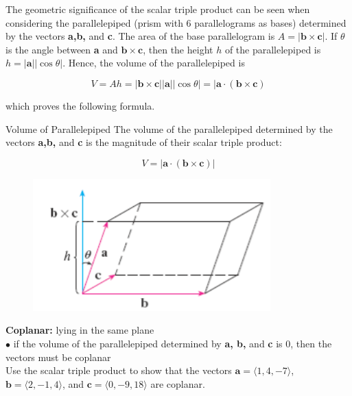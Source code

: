         The geometric significance of the scalar triple product can be seen when considering the parallelepiped (prism with 6 parallelograms as bases) determined by the vectors \textbf{a,b,} and \textbf{c}. The area of
        the base parallelogram is $A = |\mathbf{b\times c}|$. If $\theta$ is the angle between \textbf{a} and $\mathbf{b\times c}$, then the height $h$ of the parallelepiped is $h = |\mathbf{a}||\cos{\theta}|$. Hence,
        the volume of the parallelepiped is

        \[
            V = Ah = |\mathbf{b\times c}||\mathbf{a}||\cos{\theta}| = |\mathbf{a\cdot (b\times c)}
        \]

        which proves the following formula.

        \begin{axiom}{Volume of Parallelepiped}
            The volume of the parallelepiped determined by the vectors \textbf{a,b,} and \textbf{c} is the magnitude of their scalar triple product:

            \[
                V = |\mathbf{a\cdot (b\times c)}|
            \]
        \end{axiom}

        \begin{figure}[hbt!]
            \centering
            \includegraphics[]{Resources/12.4_Parallelepiped}
        \end{figure}

        \textbf{Coplanar:} lying in the same plane \\
        $\bullet$ if the volume of the parallelepiped determined by \textbf{a, b,} and \textbf{c} is 0, then the vectors must be coplanar \\

        \textit{} Use the scalar triple product to show that the vectors $\mathbf{a} = \langle 1,4,-7\rangle$, $\mathbf{b} = \langle 2, -1, 4\rangle$, and $\mathbf{c} = \langle 0, -9, 18\rangle$ are
        coplanar.

